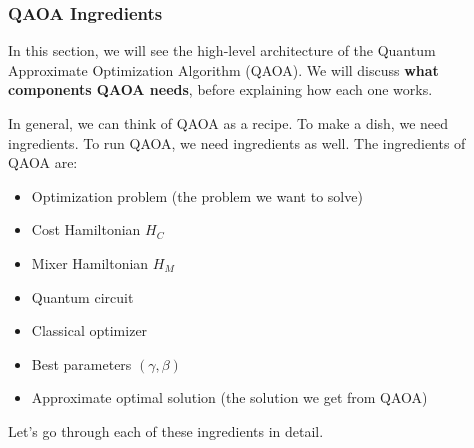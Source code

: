 \subsubsection{QAOA Ingredients}\label{sec:qaoa-ingredients}

In this section, we will see the high-level architecture of the Quantum Approximate Optimization Algorithm (QAOA). We will discuss \textbf{what components QAOA needs}, before explaining how each one works.

\highspace
In general, we can think of QAOA as a recipe. To make a dish, we need ingredients. To run QAOA, we need ingredients as well. The ingredients of QAOA are:
\begin{itemize}
    \item Optimization problem (the problem we want to solve)
    \item Cost Hamiltonian $H_C$
    \item Mixer Hamiltonian $H_M$
    \item Quantum circuit
    \item Classical optimizer
    \item Best parameters $(\gamma, \beta)$
    \item Approximate optimal solution (the solution we get from QAOA)
\end{itemize}
Let's go through each of these ingredients in detail.
